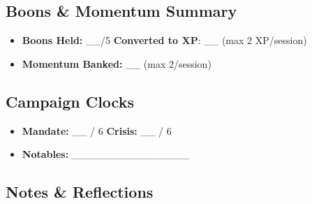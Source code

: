 \begin{multicols}{2}
\subsection{Boons \& Momentum Summary}
\begin{itemize}
  \item \textbf{Boons Held:} \_\_/5 \quad \textbf{Converted to XP}: \_\_ (max 2 XP/session)
  \item \textbf{Momentum Banked:} \_\_ (max 2/session)
\end{itemize}

\subsection{Campaign Clocks}
\begin{itemize}
  \item \textbf{Mandate:} \_\_ / 6 \qquad \textbf{Crisis:} \_\_ / 6
  \item \textbf{Notables:} \_\_\_\_\_\_\_\_\_\_\_\_\_\_\_\_
\end{itemize}

\subsection{Notes \& Reflections}
\vspace{2.5cm}

\end{multicols}
